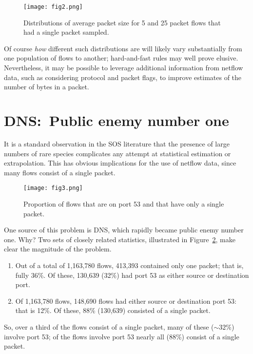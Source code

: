\documentclass{paper}
\begin{document}
\begin{figure}[h]
\begin{center}
\texttt{[image: fig2.png]}
\caption{Distributions of average packet size for 5 and 25 packet flows that
had a single packet sampled.}
\label{pkt_size_dist}
\end{center}
\end{figure}

Of course \emph{how} different such distributions are will likely vary
substantially from one population of flows to another; hard-and-fast rules may
well prove elusive. Nevertheless, it may be possible to leverage additional
information from netflow data, such as considering protocol and packet flags, to
improve estimates of the number of bytes in a packet.

\section{DNS:\ Public enemy number one}

It is a standard observation in the SOS literature that the presence of large
numbers of rare species complicates any attempt at statistical estimation or
extrapolation. This has obvious implications for the use of netflow data, since
many flows consist of a single packet.

\begin{figure}[h]
\begin{center}
\texttt{[image: fig3.png]}
\caption{Proportion of flows that are on port 53 and that have only a single
packet.}
\label{dns_vs_single}
\end{center}
\end{figure}

One source of this problem is DNS, which rapidly became public enemy number one.
Why? Two sets of closely related statistics, illustrated in
Figure~\ref{dns_vs_single}, make clear the magnitude of the problem.

\begin{enumerate}
  \item Out of a total of 1,163,780 flows, 413,393 contained only one packet;
  that is, fully 36\%. Of these, 130,639 (32\%) had port 53 as either source or
  destination port.
  \item Of 1,163,780 flows, 148,690 flows had either source or destination port
  53: that is 12\%. Of these, 88\% (130,639) consisted of a single packet.
\end{enumerate}
So, over a third of the flows consist of a single packet, many of these ($\sim
32\%$) involve port 53; of the flows involve port 53 nearly all (88\%) consist
of a single packet.
\end{document}
